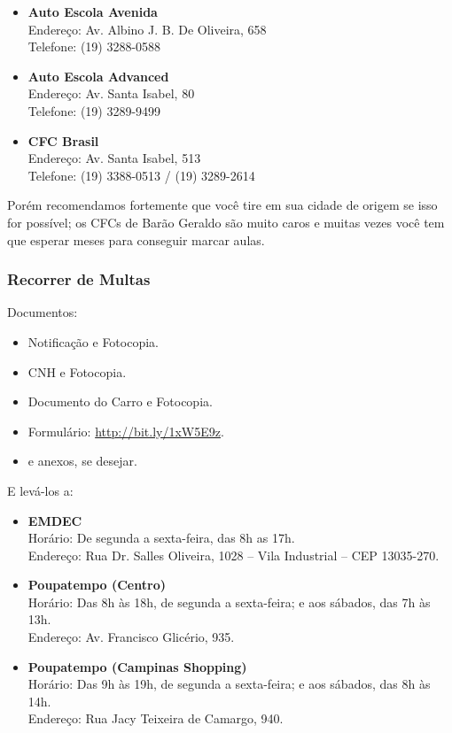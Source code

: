 \begin{itemize}
    \item \textbf{Auto Escola Avenida} \\Endereço: Av. Albino J. B. De Oliveira,
658 \\Telefone: (19) 3288-0588

    \item \textbf{Auto Escola Advanced} \\Endereço: Av. Santa Isabel, 80
\\Telefone: (19) 3289-9499

    \item \textbf{CFC Brasil} \\Endereço: Av. Santa Isabel, 513
\\Telefone: (19) 3388-0513 / (19) 3289-2614
\end{itemize}

Porém recomendamos fortemente que você tire em sua cidade de origem se isso for
possível; os CFCs de Barão Geraldo são muito caros e muitas vezes você tem que
esperar meses para conseguir marcar aulas.

\subsubsection*{Recorrer de Multas}

Documentos:
\begin{itemize}
    \item Notificação e Fotocopia.
    \item CNH e Fotocopia.
    \item Documento do Carro e Fotocopia.
    \item Formulário:
      \url{http://bit.ly/1xW5E9z}.
    \item e anexos, se desejar.
\end{itemize}

E levá-los a:
\begin{itemize}
    \item \textbf{EMDEC} \\Horário: De segunda a sexta-feira, das 8h as 17h.
\\Endereço: Rua Dr. Salles Oliveira, 1028 -- Vila Industrial -- CEP 13035-270.
    \item \textbf{Poupatempo (Centro)} \\Horário: Das 8h às 18h, de segunda a
sexta-feira; e aos sábados, das 7h às 13h.  \\Endereço: Av. Francisco Glicério,
935.
    \item \textbf{Poupatempo (Campinas Shopping)} \\Horário: Das 9h às 19h, de
segunda a sexta-feira; e aos sábados, das 8h às 14h.  \\Endereço: Rua Jacy
Teixeira de Camargo, 940.
\end{itemize}

